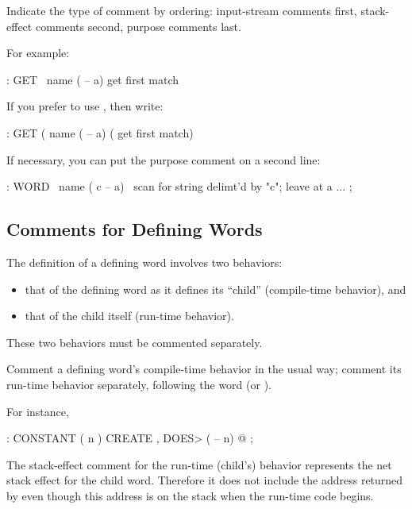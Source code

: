 \begin{tip}
Indicate the type of comment by ordering: input-stream comments first,
stack-effect comments second, purpose comments last.
\end{tip}
For example:
\begin{Code}
: GET   \   name   ( -- a)   get first match
\end{Code}
If you prefer to use \forth{(}, then write:
\begin{Code}
: GET   (   name  ( -- a)    ( get first match)
\end{Code}
If necessary, you can put the purpose comment on a second line:
\begin{Code}
: WORD   \   name   ( c -- a)
   \ scan for string delimt'd by "c"; leave at a
   ...  ;
\end{Code}
%

\subsection{Comments for Defining Words}%
The definition of a defining word involves two behaviors:

\begin{itemize}
\item that of the defining word as it defines its ``child''
(compile-time behavior), and
\item that of the child itself (run-time behavior).
\end{itemize}
These two behaviors must be commented separately.

%
\begin{tip}
Comment a defining word's compile-time behavior in the usual way;
comment its run-time behavior separately, following the word
 (or ).
\end{tip}
For instance,
\begin{Code}
: CONSTANT  ( n ) CREATE ,
   DOES>  ( -- n)  @ ;
\end{Code}
The stack-effect comment for the run-time (child's) behavior
represents the net stack effect for the child word.  Therefore it does
not include the address returned by  even though this
address is on the stack when the run-time code begins.

